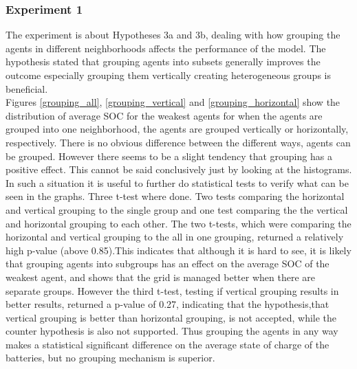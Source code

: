 \documentclass[a4paper]{article}
\begin{document}
\subsubsection{Experiment 1}
The experiment is about Hypotheses 3a and 3b, dealing with how grouping the agents in different neighborhoods affects the performance
of the model. The hypothesis stated that grouping agents into subsets generally improves the outcome especially grouping them vertically 
creating heterogeneous groups is beneficial.\\
Figures \ref{grouping_all}, \ref{grouping_vertical} and \ref{grouping_horizontal} show the distribution of average SOC for the 
weakest agents for when the agents are grouped into one neighborhood, the agents are grouped vertically or horizontally, respectively.
There is no obvious difference between the different ways, agents can be grouped. However there seems to be a slight tendency that 
grouping has a positive effect. This cannot be said conclusively just by looking at the histograms. 
In such a situation it is
useful to further do statistical tests to verify what can be seen in the graphs. Three t-test where done. Two tests 
comparing the horizontal and vertical grouping to the single group and one test comparing the the vertical and horizontal grouping to each 
other. 
The two t-tests, which were comparing the horizontal and vertical grouping to the all in one grouping, returned 
a relatively high p-value (above 0.85).This indicates that 
although it is hard to see, it is likely that grouping agents into subgroups has an effect on the average SOC of the weakest agent,
and shows that the grid is managed better when there are separate groups.
However the third t-test, testing if vertical grouping results in better results, returned a p-value of 0.27, indicating that the 
hypothesis,that vertical grouping is better than horizontal grouping, is not accepted, 
while the counter hypothesis is also not supported. Thus grouping the agents in any way makes a statistical 
significant difference on the average state of charge of the batteries, but no grouping mechanism is superior. \\
\end{document}

